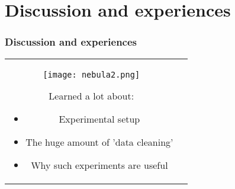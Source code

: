 \documentclass{beamer}              %
\begin{document}
\section{Discussion and experiences}
\begin{frame}
\frametitle{Discussion and experiences}

\begin{tabular}{cc}
\begin{minipage}{0.4\textwidth}
\begin{figure}[htp]
\centering
\texttt{[image: nebula2.png]}
\label{fig: nebula}
\end{figure}
\end{minipage}

\begin{minipage}{0.6\textwidth}
Learned a lot about:
\begin{itemize}
\item Experimental setup
\item The huge amount of 'data cleaning'
\item Why such experiments are useful 
\end{itemize}


\end{minipage}

\end{tabular}
\end{frame}

\end{document}
